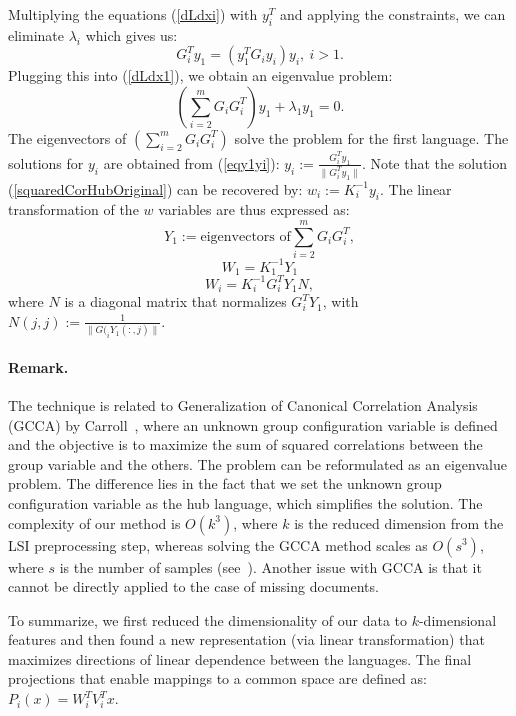 Multiplying the equations (\ref{dLdxi}) with $y_i^T$ and applying the 
constraints, we can eliminate $\lambda_i$ which gives us:
\begin{equation}\label{eqy1yi}
G_{i}^T y_1 = \left(y_1^T G_{i} y_i \right) y_i,~i > 1.
\end{equation}
Plugging this into (\ref{dLdx1}), we obtain an eigenvalue problem:
$$\left( \sum_{i = 2}^m G_i G_{i}^T \right) y_1 + \lambda_1 y_1 = 0.$$
The eigenvectors of $\left( \sum_{i = 2}^m G_i G_{i}^T \right)$ solve 
the problem for the first language. The solutions for $y_i$ are obtained 
from (\ref{eqy1yi}): $y_i := \frac{G_{i}^T y_1}{\| G_{i}^T y_1 \|}$.
Note that the solution (\ref{squaredCorHubOriginal}) can be recovered 
by: $w_i := K_i^{-1} y_i$. The linear transformation of the $w$ 
variables are thus expressed as:
$$ Y_1 := \text{eigenvectors of} \sum_{i = 2}^m G_i G_{i}^T, $$
$$ W_1 = K_1^{-1} Y_1 $$
$$ W_i = K_i^{-1} G_{i}^T Y_1 N,$$
where $N$ is a diagonal matrix that normalizes $G_{i}^T Y_1$, with 
$N(j,j) := \frac{1}{\|G(_{i} Y_1(:,j)\|}$.

\paragraph{Remark.} The technique is related to  Generalization of Canonical 
Correlation Analysis (GCCA) by Carroll~\citeyear{Carroll}, where an unknown 
group configuration variable is defined and the objective is to maximize the 
sum of squared correlations between the group variable and the others. The 
problem can be reformulated as an eigenvalue problem. The difference lies in 
the fact that we set the unknown group configuration variable as the hub language, 
which simplifies the solution. The complexity of our method is $O(k^3)$, where $k$ 
is the reduced dimension from the LSI preprocessing step, whereas solving the 
GCCA method scales as $O(s^3)$, where $s$ is the number of samples (see~\cite{gifi}). 
Another issue with GCCA is that it cannot be directly applied to the case of missing documents.

To summarize, we first reduced the dimensionality of our data to $k$-dimensional 
features and then found a new representation (via linear transformation) that 
maximizes directions of linear dependence between the languages. The final 
projections that enable mappings to a common space are defined as: 
$P_i(x) = W_i^T V_i^T x.$

